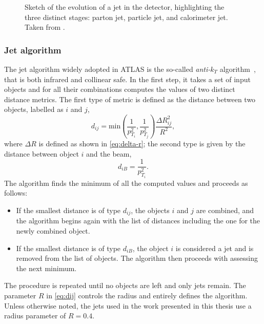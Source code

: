 
\FloatBarrier
\begin{figure}
    \caption{Sketch of the evolution of a jet in the detector, highlighting the three distinct stages: parton jet, particle jet, and calorimeter jet. Taken from .}
    \label{fig:jet-evolution}
\end{figure}

\subsubsection{Jet algorithm}
\label{subsubsec:jet-algorithm}
The jet algorithm widely adopted in ATLAS is the so-called \emph{anti-$k_T$} algorithm~\cite{Cacciari:2008gp}, that is both infrared and collinear safe.
In the first step, it takes a set of input objects and for all their combinations computes the values of two distinct distance metrics.
The first type of metric is defined as the distance between two objects, labelled as $i$ and $j$,
\begin{equation}
    d_{ij} = \text{min}\left(\frac{1}{p_{T_i}^2},\frac{1}{p_{T_j}^2}\right) \frac{\Delta R_{ij}^2}{R^2},
    \label{eq:dij}
\end{equation}
where $\Delta R$ is defined as shown in \cref{eq:delta-r}; the second type is given by the distance between object $i$ and the beam,
\begin{equation}
    d_{iB} = \frac{1}{p_{T_i}^2}.
\end{equation}
The algorithm finds the minimum of all the computed values and proceeds as follows:
\begin{itemize}
    \item If the smallest distance is of type $d_{ij}$, the objects $i$ and $j$ are combined, and the algorithm begins again with the list of distances including the one for the newly combined object.
    \item If the smallest distance is of type $d_{iB}$, the object $i$ is considered a jet and is removed from the list of objects. The algorithm then proceeds with assessing the next minimum.
\end{itemize}
The procedure is repeated until no objects are left and only jets remain.
The parameter $R$ in \cref{eq:dij} controls the radius and entirely defines the algorithm.
Unless otherwise noted, the jets used in the work presented in this thesis use a radius parameter of $R = 0.4$.


